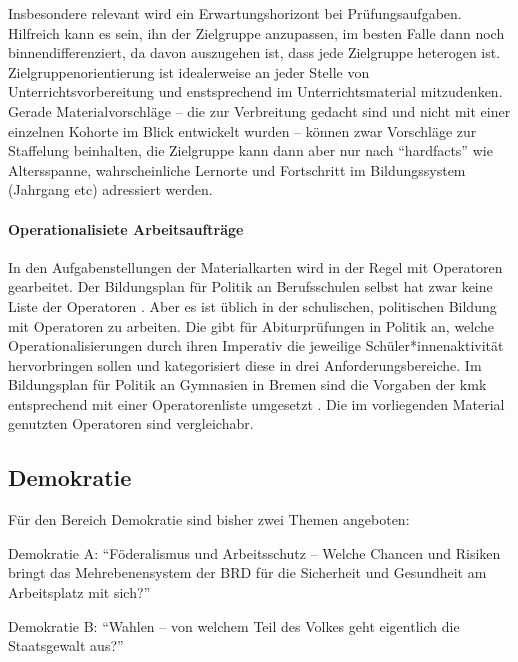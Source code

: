 Insbesondere relevant wird ein Erwartungshorizont bei Prüfungsaufgaben. Hilfreich kann es sein, ihn der Zielgruppe anzupassen, im besten Falle dann noch binnendifferenziert, da davon auszugehen ist, dass jede Zielgruppe heterogen ist.
Zielgruppenorientierung ist idealerweise an jeder Stelle von Unterrichtsvorbereitung und enstsprechend im Unterrichtsmaterial mitzudenken. 
Gerade Materialvorschläge -- die zur Verbreitung gedacht sind und nicht mit einer einzelnen Kohorte im Blick entwickelt wurden -- können zwar Vorschläge zur Staffelung beinhalten, die Zielgruppe kann dann aber nur nach \enquote{hardfacts} wie Altersspanne, wahrscheinliche Lernorte und Fortschritt im Bildungssystem (Jahrgang \gls{etc}) adressiert werden. 



\paragraph{Operationalisiete Arbeitsaufträge}
In den Aufgabenstellungen der Materialkarten wird in der Regel mit Operatoren gearbeitet. Der Bildungsplan für Politik an Berufsschulen selbst hat zwar keine Liste der Operatoren \autocite{bplan}. Aber es ist üblich in der schulischen, politischen Bildung mit Operatoren zu arbeiten. Die \textcite[14-18]{KMK.2005} gibt für Abiturprüfungen in Politik an, welche Operationalisierungen durch ihren Imperativ die jeweilige Schüler*innenaktivität hervorbringen sollen und kategorisiert diese in drei Anforderungsbereiche. Im Bildungsplan für Politik an Gymnasien in Bremen sind die Vorgaben der \gls{kmk} entsprechend mit einer Operatorenliste umgesetzt \autocite[13-14]{lower2008}.
Die im vorliegenden Material genutzten Operatoren sind vergleichabr. 

\subsection{Demokratie \label{Denmokratie}}
Für den Bereich Demokratie sind bisher zwei Themen angeboten:
\begin{myenumerate}
    \item Demokratie A: \enquote{Föderalismus und Arbeitsschutz – Welche Chancen und Risiken bringt das Mehrebenensystem der BRD für die Sicherheit und Gesundheit am Arbeitsplatz mit sich?}
    \item Demokratie B: \enquote{Wahlen – von welchem Teil des Volkes geht eigentlich die Staatsgewalt aus?}
\end{myenumerate}



